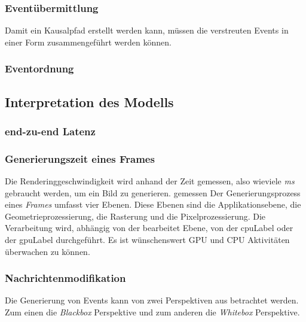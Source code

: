 \subsubsection{Eventübermittlung}
\label{section:Eventübermittlung}
Damit ein Kausalpfad erstellt werden kann, müssen die verstreuten Events in einer Form zusammengeführt werden können.

\subsubsection{Eventordnung}

\subsection{Interpretation des Modells}

\subsubsection{end-zu-end Latenz}

\subsubsection{Generierungszeit eines Frames}
Die Renderinggeschwindigkeit wird anhand der Zeit gemessen, also wieviele \emph{ms} gebraucht werden, um ein Bild zu generieren. gemessen Der Generierungsprozess eines \emph{Frames} umfasst vier Ebenen. Diese Ebenen sind die Applikationsebene, die Geometrieprozessierung, die Rasterung und die Pixelprozessierung. Die Verarbeitung wird, abhängig von der bearbeitet Ebene, von der \gls{cpuLabel} oder der \gls{gpuLabel} durchgeführt. Es ist wünschenswert GPU und CPU Aktivitäten überwachen zu können.

\subsubsection{Nachrichtenmodifikation}

Die Generierung von Events kann von zwei Perspektiven aus betrachtet werden.
Zum einen die \emph{Blackbox} Perspektive und zum anderen die \emph{Whitebox} Perspektive.

